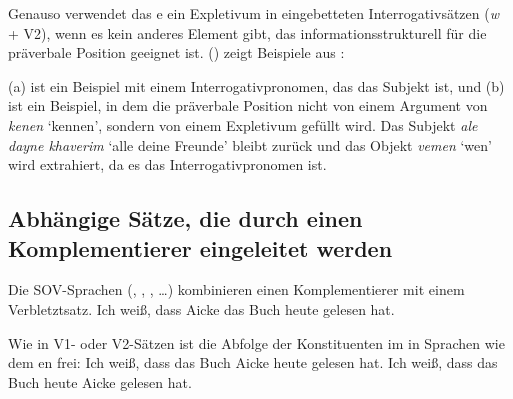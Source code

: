 \noindent
Genauso verwendet das e ein Expletivum in eingebetteten Interrogativsätzen (\emph{w} + V2), wenn
es kein anderes Element gibt, das informationsstrukturell für die präverbale Position geeignet ist.
() zeigt Beispiele aus \citet[--404]{Prince89a}:

\eal
\label{ex-Yiddish-interrogatives-expletive}
\zl

(a) ist ein Beispiel mit einem Interrogativpronomen, das das Subjekt ist, und (b) ist ein
Beispiel, in dem die präverbale Position nicht von einem Argument von \emph{kenen} `kennen', sondern von
einem Expletivum gefüllt wird. Das Subjekt \emph{ale dayne khaverim} `alle deine Freunde' bleibt zurück und das Objekt
\emph{vemen} `wen' wird extrahiert, da es das Interrogativpronomen ist.

\subsection{Abhängige Sätze, die durch einen Komplementierer eingeleitet werden}

Die SOV-Sprachen (, , , \ldots) kombinieren einen Komplementierer mit einem Verbletztsatz.
\ea Ich weiß, dass Aicke das Buch heute gelesen hat. \z

Wie in V1- oder V2-Sätzen ist die Abfolge der Konstituenten im \mf in Sprachen wie dem en frei:
\eal
\ex Ich weiß, dass das Buch Aicke heute gelesen hat.
\ex Ich weiß, dass das Buch heute Aicke gelesen hat.
\zl

